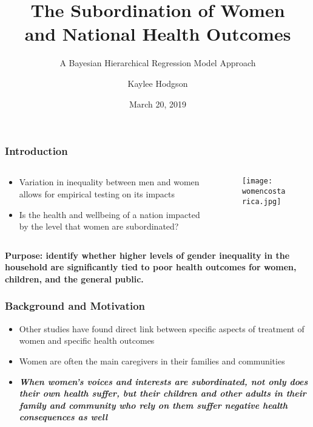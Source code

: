 \documentclass{beamer}
\title{The Subordination of Women \\ and National Health Outcomes}
\subtitle{A Bayesian Hierarchical Regression Model Approach}
\author{Kaylee Hodgson}
\institute{Brigham Young University}
\date{March 20, 2019}
\begin{document}
\begin{frame}
\titlepage
\end{frame}

\begin{frame}
\frametitle{Introduction}
\begin{columns}
	\begin{column}{0.48\textwidth}
\begin{itemize}
\item Variation in inequality between men and women allows for empirical testing on its impacts
\item Is the health and wellbeing of a nation impacted by the level that women are subordinated?
\end{itemize}
	\end{column}
	\begin{column}{0.48\textwidth}
		\begin{figure}
\texttt{[image: womencostarica.jpg]}
\end{figure}
	\end{column}
\end{columns}
\bigskip
\textbf{Purpose: identify whether higher levels of gender inequality in the household are significantly tied to poor health outcomes for women, children, and the general public.}
\end{frame}

\begin{frame}
\frametitle{Background and Motivation}
\begin{itemize}
\item Other studies have found direct link between specific aspects of treatment of women and specific health outcomes
\item Women are often the main caregivers in their families and communities
\item \textbf{\textit{When women's voices and interests are subordinated, not only does their own health suffer, but their children and other adults in their family and community who rely on them suffer negative health consequences as well}}
\end{itemize}
\end{frame}
\end{document}
